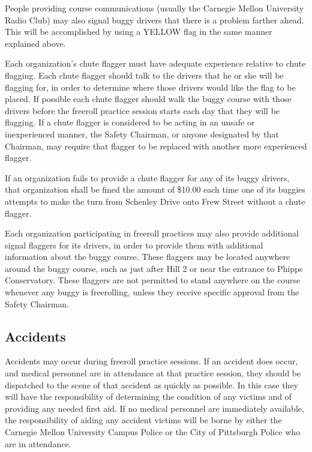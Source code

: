 	People providing course communications (usually the Carnegie Mellon
	University Radio Club) may also signal buggy drivers that there is a problem
	farther ahead. This will be accomplished by using a YELLOW flag in the same
	manner explained above.

	Each organization's chute flagger must have adequate experience relative to
	chute flagging. Each chute flagger should talk to the drivers that he or she
	will be flagging for, in order to determine where those drivers would like the
	flag to be placed. If possible each chute flagger should walk the buggy course
	with those drivers before the freeroll practice session starts each day that
	they will be flagging. If a chute flagger is considered to be acting in an
	unsafe or inexperienced manner, the Safety Chairman, or anyone designated by
	that Chairman, may require that flagger to be replaced with another more
	experienced flagger.

	If an organization fails to provide a chute flagger for any of its buggy
	drivers, that organization shall be fined the amount of \$10.00 each time one
	of its buggies attempts to make the turn from Schenley Drive onto Frew Street
	without a chute flagger.

	Each organization participating in freeroll practices may also provide
	additional signal flaggers for its drivers, in order to provide them with
	additional information about the buggy course. These flaggers may be located
	anywhere around the buggy course, such as just after Hill 2 or near the
	entrance to Phipps Conservatory. These flaggers are not permitted to stand
	anywhere on the course whenever any buggy is freerolling, unless they receive
	specific approval from the Safety Chairman.

\subsection{Accidents}

	Accidents may occur during freeroll practice sessions. If an accident does
	occur, and medical personnel are in attendance at that practice session, they
	should be dispatched to the scene of that accident as quickly as possible. In
	this case they will have the responsibility of determining the condition of any
	victims and of providing any needed first aid. If no medical personnel are
	immediately available, the responsibility of aiding any accident victims will
	be borne by either the Carnegie Mellon University Campus Police or the City of
	Pittsburgh Police who are in attendance.

